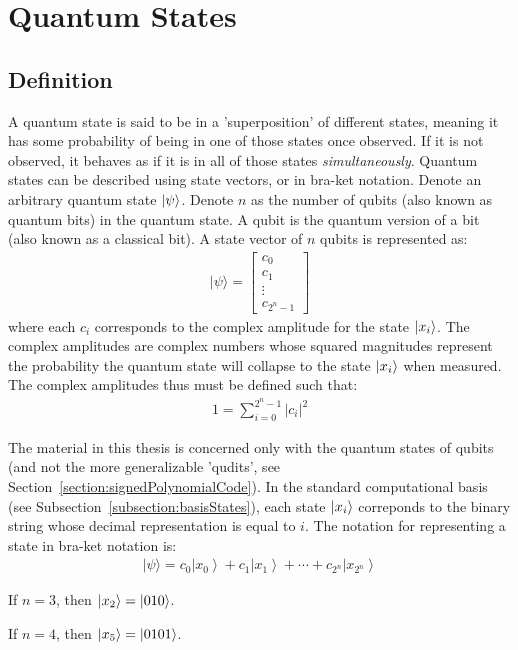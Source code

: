 \section{Quantum States}
\subsection{Definition}
A quantum state is said to be in a 'superposition' of different states, meaning it has some probability of being in one of those states once observed. If it is not observed, it behaves as if it is in all of those states \emph{simultaneously}. Quantum states can be described using state vectors, or in bra-ket notation.
Denote an arbitrary quantum state $\ket{\psi}$. Denote $n$ as the number of qubits (also known as quantum bits) in the quantum state. A qubit is the quantum version of a bit (also known as a classical bit). A state vector of $n$ qubits is represented as:
\begin{align}
|\psi\rangle=\left[\begin{array}{c}
c_{0} \\
c_{1} \\
\vdots \\
c_{2^n - 1}
\end{array}\right]
\end{align}
where each $c_i$ corresponds to the complex amplitude for the state $\ket{x_i}$. The complex amplitudes are complex numbers whose squared magnitudes represent the probability the quantum state will collapse to the state $\ket{x_i}$ when measured. The complex amplitudes thus must be defined such that:
\begin{align}
\label{eq:quantumStateConstraint}
1 = \sum_{i=0}^{2^n - 1} \lvert c_i \rvert ^2
\end{align}

The material in this thesis is concerned only with the quantum states of qubits (and not the more generalizable 'qudits', see Section~\ref{section:signedPolynomialCode}). In the standard computational basis (see Subsection~\ref{subsection:basisStates}), each state $\ket{x_i}$ correponds to the binary string whose decimal representation is equal to $i$. The notation for representing a state in bra-ket notation is:
\begin{align}
\label{eq:braketArbitraryStandardBasisState}
|\psi\rangle=c_{0}\left|x_{0}\right\rangle+c_{1}\left|x_{1}\right\rangle+\cdots+c_{2^n}\left|x_{2^n}\right\rangle
\end{align}
\begin{example}
If $n=3$, then $\ket{x_2} = \ket{010}$.
\end{example}
\begin{example}
If $n=4$, then $\ket{x_5} = \ket{0101}$.
\end{example}

